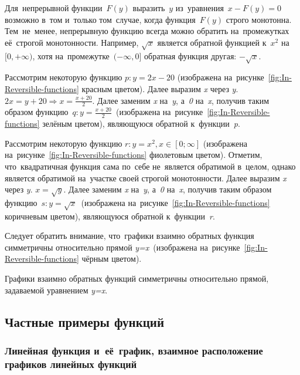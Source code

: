 \documentclass[]{scrartcl}
\begin{document}
{{Для~непрерывной функции~${\displaystyle F(y)}$ выразить~${\displaystyle y}$ из~уравнения~${\displaystyle x-F(y)=0}$ возможно в~том и~только том~случае, когда функция~${\displaystyle F(y)}$ строго монотонна. Тем~не~менее, непрерывную функцию всегда можно обратить на~промежутках её~строгой монотонности. Например, ${\displaystyle {\sqrt {x}}}$ является обратной функцией к~${\displaystyle x^{2}}$ на~${\displaystyle [0,+\infty )}$, хотя на~промежутке~${\displaystyle (-\infty ,0]}$ обратная функция другая: ${\displaystyle -{\sqrt {x}}}$.
\begin{Thexmpl}
	Рассмотрим некоторую функцию ${\displaystyle p:y=2x-20}$ (изображена на~рисунке~\ref{fig:In-Reversible-functions} красным цветом). Далее выразим \textit{x} через \textit{y}. ${\displaystyle 2x=y+20 \Rightarrow x=\frac{x+20}{2}}$. Далее заменим \textit{x} на~\textit{y}, а~\textit{0} на~\textit{x}, получив таким образом функцию~${\displaystyle q:y=\frac{x+20}{2}}$~(изображена на~рисунке~\ref{fig:In-Reversible-functions} зелёным цветом), являющуюся обратной к~функции~\textit{p}.
\end{Thexmpl}
\begin{Thexmpl}
	Рассмотрим некоторую функцию ${\displaystyle r:y=x^{2}, x \in [0;\infty]}$ (изображена на~рисунке~\ref{fig:In-Reversible-functions} фиолетовым цветом). Отметим, что~квадратичная функция сама по~себе не~является обратимой в~целом, однако является обратимой на~участке своей строгой монотонности. Далее выразим \textit{x} через \textit{y}. ${\displaystyle x=\sqrt{y}}$. Далее заменим \textit{x} на~\textit{y}, а~\textit{0} на~\textit{x}, получив таким образом функцию~${\displaystyle s:y=\sqrt{x}}$~(изображена на~рисунке~\ref{fig:In-Reversible-functions} коричневым цветом), являющуюся обратной к~функции~\textit{r}.
\end{Thexmpl}
Следует обратить внимание, что~графики взаимно обратных функция симметричны относительно прямой \textit{y=x}~(изображена на~рисунке~\ref{fig:In-Reversible-functions} чёрным цветом).
\begin{proposition}
	Графики взаимно обратных функций симметричны относительно прямой, задаваемой уравнением \textit{y=x}.
\end{proposition}


\subsection{Частные примеры функций}
\subsubsection{Линейная функция и~её~график, взаимное расположение графиков линейных функций}

}}
\end{document}
